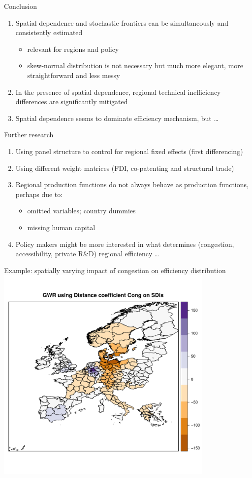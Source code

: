 \documentclass[ignorenonframetext]{beamer}
\begin{document}
\begin{frame}{Conclusion}
\begin{enumerate}
\item Spatial dependence and stochastic frontiers can be simultaneously and consistently estimated 
\begin{itemize}
	\item relevant for regions and policy
	\item skew-normal distribution is not necessary but much more elegant, more straightforward and less messy
\end{itemize}
\item In the presence of spatial dependence, regional technical inefficiency differences are significantly mitigated
\item Spatial dependence seems to dominate efficiency mechanism, but \ldots
\end{enumerate}
\end{frame}

\begin{frame}{Further research}
\begin{enumerate}
	\item Using panel structure to control for regional fixed effects (first differencing)
	\item Using different weight matrices (FDI, co-patenting and structural trade)
	\item Regional production functions do not always behave as production functions, perhaps due to:
	\begin{itemize}
		\item omitted variables; country dummies
		\item missing human capital
	\end{itemize}
	\item Policy makers might be more interested in what determines (congestion, accessibility, private R\&D) regional efficiency \ldots
\end{enumerate}
\end{frame}

\begin{frame}{Example: spatially varying impact of congestion on efficiency distribution}
\includegraphics[width=0.8\textwidth]{DistanceSdisCong}
\end{frame}
\end{document}
